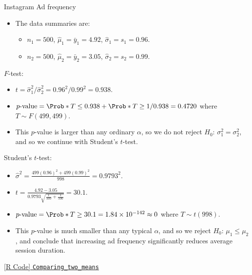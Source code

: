 \begin{Example}{Instagram Ad frequency}{}
\begin{itemize}
                  \centerline{$ H_0 $: $ \mu_1\le \mu_2 $ versus $ H_\text{A} $: $ \mu_1>\mu_2 $}
            \item The data summaries are:
                  \begin{itemize}
                        \item $ n_1=500 $, $ \hat{\mu}_1=\bar{y}_1=4.92 $, $ \hat{\sigma}_1=s_1=0.96 $.
                        \item $ n_2=500 $, $ \hat{\mu}_2=\bar{y}_2=3.05 $, $ \hat{\sigma}_2=s_2=0.99 $.
                  \end{itemize}
      \end{itemize}
      \begin{framed}
            $ F $-test:
            \begin{itemize}
                  \item $ t=\hat{\sigma}_1^2/\hat{\sigma}_2^2=0.96^2/0.99^2=0.938 $.
                  \item $ p\text{-value}=\Prob*{T\le 0.938}+\Prob*{T\ge 1/0.938}=0.4720 $
                        where $ T \sim F(499,499) $.
                  \item This $ p $-value is larger than any ordinary $ \alpha $, so
                        we do not reject $ H_0 $: $ \sigma_1^2=\sigma_2^2 $, and so we continue
                        with Student's $ t $-test.
            \end{itemize}
      \end{framed}
      \begin{framed}
            Student's $ t $-test:
            \begin{itemize}
                  \item $ \displaystyle \hat{\sigma}^2=\frac{499(0.96)^2+499(0.99)^2}{998}=0.9793^2 $.
                  \item $ \displaystyle t=\frac{4.92-3.05}{0.9793\sqrt{\frac{1}{500} +\frac{1}{500} }}=30.1  $.
                  \item $ p\text{-value}=\Prob*{T\ge 30.1}=1.84\times 10^{-142}\approx 0 $ where $ T \sim t(998) $.
                  \item This $ p $-value is much smaller than any typical $ \alpha $, and so we reject
                        $ H_0 $: $ \mu_1\le \mu_2 $, and conclude that increasing ad frequency significantly
                        reduces average session duration.
            \end{itemize}
      \end{framed}
      \href{https://github.com/Hextical/university-notes/blob/master/year-3/semester-3/STAT 430/code/2.2 - Comparing_two_means.R}{[R Code] \texttt{Comparing\_two\_means}}
\end{Example}
